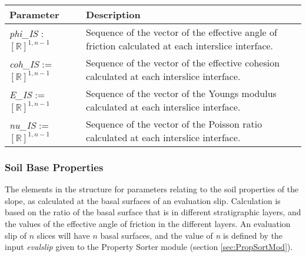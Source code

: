 \documentclass[12pt]{article}
\begin{document}
\begin{center}
\begin{longtable}{p{} p{}}
  \hline \textbf{Parameter} & \textbf{Description} \\ \hline
    
  \textit{phi\_IS} : $[\mathbb{R}]^{1,n-1}$ & Sequence of the vector
  of the effective angle of friction calculated at each interslice
  interface. \\

  \textit{coh\_IS} := $[\mathbb{R}]^{1,n-1}$ & Sequence of the vector
  of the effective cohesion calculated at each interslice interface.\\

  \textit{E\_IS} := $[\mathbb{R}]^{1,n-1}$ & Sequence of the vector of
  the Youngs modulus calculated at each interslice interface.\\

  \textit{nu\_IS} := $[\mathbb{R}]^{1,n-1}$ & Sequence of the vector
  of the Poisson ratio calculated at each interslice
  interface. \\ \hline
\end{longtable}
\end{center}

\subsubsection{Soil Base Properties} \label{Tbl:SoilBaseParam}
The elements in the structure for parameters relating to the soil
properties of the slope, as calculated at the basal surfaces of an
evaluation slip. Calculation is based on the ratio of the basal
surface that is in different stratigraphic layers, and the values of
the effective angle of friction in the different layers. An evaluation
slip of $n$ slices will have $n$ basal surfaces, and the value of
\textit{n} is defined by the input \textit{evalslip} given to
the Property Sorter module (section \ref{sec:PropSortMod}).
\end{document}
